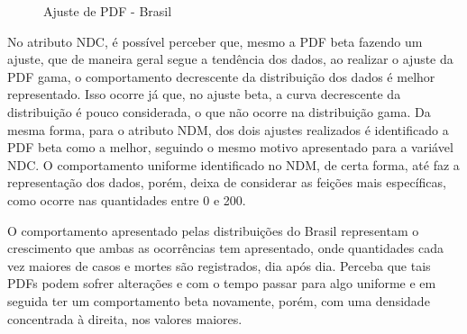 \documentclass[a4paper,12pt]{article}
\begin{document}
\begin{figure}[H]
\captionsetup[subfigure]{labelformat=empty}
\caption{Ajuste de PDF - Brasil}
\centering
{}
\qquad
{}
\label{figure:pdf1}
\end{figure}

\par No atributo NDC, é possível perceber que, mesmo a PDF beta fazendo um ajuste, que de maneira geral segue a tendência dos dados, ao realizar o ajuste da PDF gama, o comportamento decrescente da distribuição dos dados é melhor representado. Isso ocorre já que, no ajuste beta, a curva decrescente da distribuição é pouco considerada, o que não ocorre na distribuição gama. Da mesma forma, para o atributo NDM, dos dois ajustes realizados é identificado a PDF beta como a melhor, seguindo o mesmo motivo apresentado para a variável NDC. O comportamento uniforme identificado no NDM, de certa forma, até faz a representação dos dados, porém, deixa de considerar as feições mais específicas, como ocorre nas quantidades entre 0 e 200.

\par O comportamento apresentado pelas distribuições do Brasil representam o crescimento que ambas as ocorrências tem apresentado, onde quantidades cada vez maiores de casos e mortes são registrados, dia após dia. Perceba que tais PDFs podem sofrer alterações e com o tempo passar para algo uniforme e em seguida ter um comportamento beta novamente, porém, com uma densidade concentrada à direita, nos valores maiores.
\end{document}
